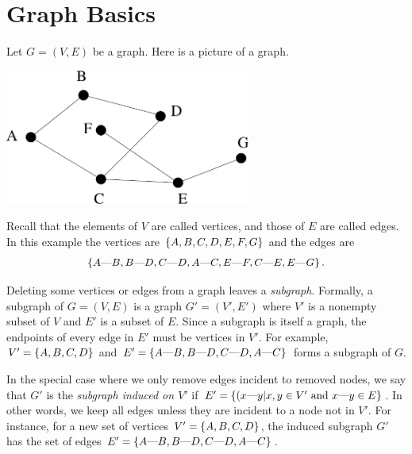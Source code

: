 \documentclass[12pt]{article}
\newcommand{\edge}[2]{#1\text{---}#2}
\begin{document}

\section*{Graph Basics}

Let $G = (V,E)$ be a graph. Here is a picture of a graph.
\begin{center}
\includegraphics[height=1.75in]{example}
\end{center}
Recall that the elements of $V$ are called vertices, and those of $E$
are called edges. In this example the vertices are $\left\{A, B, C, D,
  E, F,G\right\}$ and the edges are $$\set{\edge{A}{B}, \edge{B}{D},
  \edge{C}{D}, \edge{A}{C}, \edge{E}{F}, \edge{C}{E}, \edge{E}{G}}.$$

Deleting some vertices or edges from a graph leaves a {\em subgraph}.
Formally, a subgraph of $G = (V, E)$ is a graph $G' = (V', E')$ where
$V'$ is a nonempty subset of $V$ and $E'$ is a subset of $E$.  Since a
subgraph is itself a graph, the endpoints of every edge in $E'$ must
be vertices in $V'$. For example, $V' = \left\{A,B,C,D\right\}$ and $E' =
\set{\edge{A}{B},\edge{B}{D},\edge{C}{D}, \edge{A}{C}}$ forms a
subgraph of $G$.

In the special case where we only remove edges incident to removed
nodes, we say that $G'$ is the {\em subgraph induced on $V'$} if $E' =
\{( \edge{x}{y}| x,y \in V' {\rm ~and~} \edge{x}{y} \in E \}$.  In
other words, we keep all edges unless they are incident to a node not
in $V'$. For instance, for a new set of vertices $V'=\left\{A,B,C,D\right\}$,
the induced subgraph $G'$ has the set of edges $E'=
\set{\edge{A}{B},\edge{B}{D},\edge{C}{D}, \edge{A}{C}}$.
\end{document}
